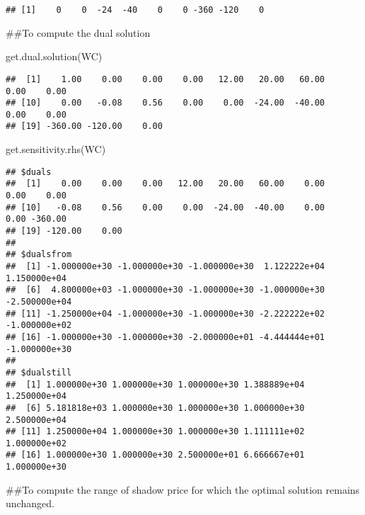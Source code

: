 \documentclass[
]{article}
\newenvironment{Shaded}{\begin{snugshade}}{\end{snugshade}}
\newcommand{\AttributeTok}[1]{\textcolor[rgb]{0.77,0.63,0.00}{#1}}
\newcommand{\DecValTok}[1]{\textcolor[rgb]{0.00,0.00,0.81}{#1}}
\newcommand{\FunctionTok}[1]{\textcolor[rgb]{0.00,0.00,0.00}{#1}}
\newcommand{\NormalTok}[1]{#1}
\newcommand{\SpecialCharTok}[1]{\textcolor[rgb]{0.00,0.00,0.00}{#1}}
\begin{document}
\begin{verbatim}
## [1]    0    0  -24  -40    0    0 -360 -120    0
\end{verbatim}

\#\#To compute the dual solution

\begin{Shaded}
\begin{Highlighting}[]
\FunctionTok{get.dual.solution}\NormalTok{(WC)}
\end{Highlighting}
\end{Shaded}

\begin{verbatim}
##  [1]    1.00    0.00    0.00    0.00   12.00   20.00   60.00    0.00    0.00
## [10]    0.00   -0.08    0.56    0.00    0.00  -24.00  -40.00    0.00    0.00
## [19] -360.00 -120.00    0.00
\end{verbatim}

\begin{Shaded}
\begin{Highlighting}[]
\FunctionTok{get.sensitivity.rhs}\NormalTok{(WC)}
\end{Highlighting}
\end{Shaded}

\begin{verbatim}
## $duals
##  [1]    0.00    0.00    0.00   12.00   20.00   60.00    0.00    0.00    0.00
## [10]   -0.08    0.56    0.00    0.00  -24.00  -40.00    0.00    0.00 -360.00
## [19] -120.00    0.00
## 
## $dualsfrom
##  [1] -1.000000e+30 -1.000000e+30 -1.000000e+30  1.122222e+04  1.150000e+04
##  [6]  4.800000e+03 -1.000000e+30 -1.000000e+30 -1.000000e+30 -2.500000e+04
## [11] -1.250000e+04 -1.000000e+30 -1.000000e+30 -2.222222e+02 -1.000000e+02
## [16] -1.000000e+30 -1.000000e+30 -2.000000e+01 -4.444444e+01 -1.000000e+30
## 
## $dualstill
##  [1] 1.000000e+30 1.000000e+30 1.000000e+30 1.388889e+04 1.250000e+04
##  [6] 5.181818e+03 1.000000e+30 1.000000e+30 1.000000e+30 2.500000e+04
## [11] 1.250000e+04 1.000000e+30 1.000000e+30 1.111111e+02 1.000000e+02
## [16] 1.000000e+30 1.000000e+30 2.500000e+01 6.666667e+01 1.000000e+30
\end{verbatim}

\#\#To compute the range of shadow price for which the optimal solution
remains unchanged.

\begin{Shaded}
\end{Shaded}
\end{document}
